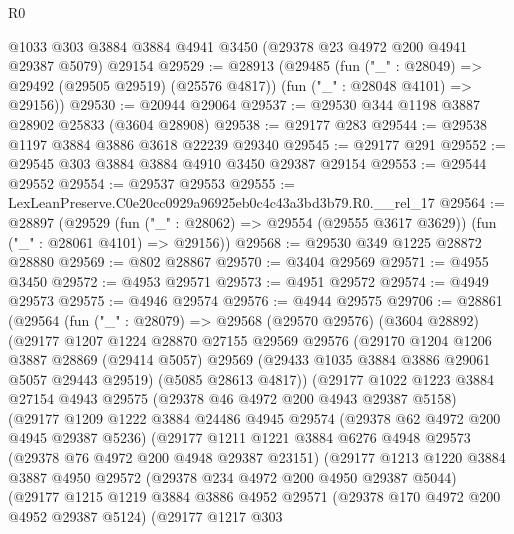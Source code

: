 \begin{lexlean}{R0}
\begin{coremodule}
    @1033
    @303
    @3884
    @3884
    @4941
    @3450
    (@29378 @23 @4972 @200 @4941 @29387 @5079)
    @29154
@29529 := @28913
    (@29485
      (fun ("_" : @28049) => @29492 (@29505 @29519) (@25576 @4817))
      (fun ("_" : @28048 @4101) => @29156))
@29530 := @20944 @29064
@29537 := @29530 @344 @1198 @3887 @28902 @25833 (@3604 @28908)
@29538 := @29177 @283
@29544 := @29538 @1197 @3884 @3886 @3618 @22239 @29340
@29545 := @29177 @291
@29552 := @29545 @303 @3884 @3884 @4910 @3450 @29387 @29154
@29553 := @29544 @29552
@29554 := @29537 @29553
@29555 := LexLeanPreserve.C0e20cc0929a96925eb0c4c43a3bd3b79.R0.__rel_17
@29564 := @28897
    (@29529
      (fun ("_" : @28062) => @29554 (@29555 @3617 @3629))
      (fun ("_" : @28061 @4101) => @29156))
@29568 := @29530 @349 @1225 @28872 @28880
@29569 := @802 @28867
@29570 := @3404 @29569
@29571 := @4955 @3450
@29572 := @4953 @29571
@29573 := @4951 @29572
@29574 := @4949 @29573
@29575 := @4946 @29574
@29576 := @4944 @29575
@29706 := @28861
    (@29564
      (fun ("_" : @28079) =>
      @29568
        (@29570 @29576)
        (@3604 @28892)
        (@29177
          @1207
          @1224
          @28870
          @27155
          @29569
          @29576
          (@29170
            @1204
            @1206
            @3887
            @28869
            (@29414 @5057)
            @29569
            (@29433 @1035 @3884 @3886 @29061 @5057 @29443 @29519)
            (@5085 @28613 @4817))
          (@29177
            @1022
            @1223
            @3884
            @27154
            @4943
            @29575
            (@29378 @46 @4972 @200 @4943 @29387 @5158)
            (@29177
              @1209
              @1222
              @3884
              @24486
              @4945
              @29574
              (@29378 @62 @4972 @200 @4945 @29387 @5236)
              (@29177
                @1211
                @1221
                @3884
                @6276
                @4948
                @29573
                (@29378 @76 @4972 @200 @4948 @29387 @23151)
                (@29177
                  @1213
                  @1220
                  @3884
                  @3887
                  @4950
                  @29572
                  (@29378 @234 @4972 @200 @4950 @29387 @5044)
                  (@29177
                    @1215
                    @1219
                    @3884
                    @3886
                    @4952
                    @29571
                    (@29378 @170 @4972 @200 @4952 @29387 @5124)
                    (@29177
                      @1217
                      @303

\end{coremodule}
\end{lexlean}
